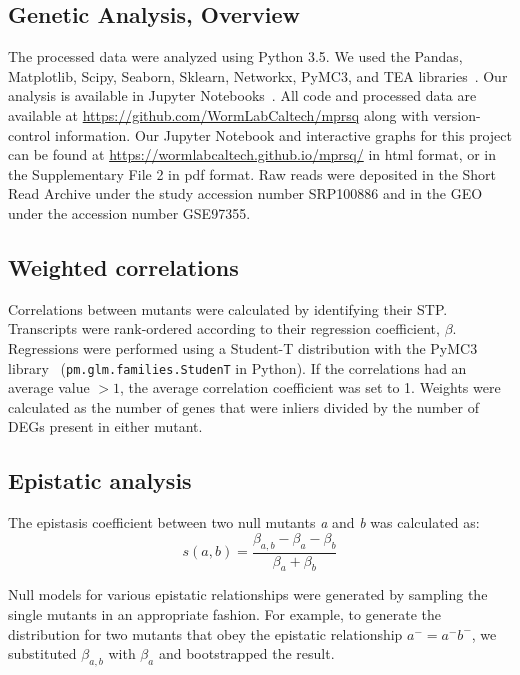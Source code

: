 \documentclass[9pt,twocolumn,twoside]{pnas-new}
\newcommand{\gene}[1]{\mbox{\emph{#1}}}
\begin{document}
{\subsection*{Genetic Analysis, Overview}
The processed data were analyzed using Python 3.5. We used the Pandas,
Matplotlib, Scipy, Seaborn, Sklearn, Networkx, PyMC3, and TEA
libraries~\cite{McKinney2011,Oliphant2007,
Pedregosa2012,Salvatier2015,VanDerWalt2011,Hunter2007,Angeles-Albores2016,Waskom}.
Our analysis is available in Jupyter Notebooks~\cite{Perez2007}. All code and
processed data are available at
\url{https://github.com/WormLabCaltech/mprsq} along with version-control
information. Our Jupyter Notebook and interactive graphs for this project can be
found at \url{https://wormlabcaltech.github.io/mprsq/} in html format, or in
the Supplementary File 2 in pdf format. Raw reads were deposited
in the Short Read Archive under the study accession number SRP100886 and in the
GEO under the accession number GSE97355.

\subsection*{Weighted correlations}
Correlations between mutants were calculated by identifying their
STP. Transcripts were rank-ordered according to their regression coefficient,
$\beta$. Regressions were performed using a Student-T
distribution with the PyMC3 library~\cite{Salvatier2015}
(\texttt{pm.glm.families.StudenT} in Python). If the correlations had an average
value $>1$, the average correlation coefficient was set to 1.
Weights were calculated as the number of genes that were inliers divided by the
number of DEGs present in either mutant.

\subsection*{Epistatic analysis}
The epistasis coefficient between two null mutants \gene{a} and \gene{b} was
calculated as:
\begin{equation}
  s(a, b) = \frac{\beta_{a,b} - \beta_a - \beta_b}{\beta_a + \beta_b}
\label{eq:epistasis_coef}
\end{equation}

Null models for various epistatic relationships were generated by sampling the
single mutants in an appropriate fashion. For example, to generate the
distribution for two mutants that obey the epistatic relationship $a^- =
a^-b^-$, we substituted $\beta_{a, b}$ with $\beta_a$ and bootstrapped the
result.

}
\end{document}
